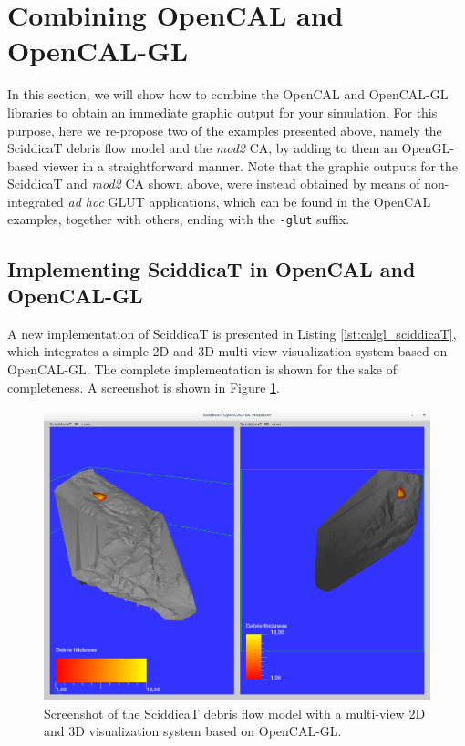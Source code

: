 \section{Combining OpenCAL and OpenCAL-GL}\label{sec:combining_gl}

In this section, we will show how to combine the OpenCAL and
OpenCAL-GL libraries to obtain an immediate graphic output for your
simulation. For this purpose, here we re-propose two of the examples
presented above, namely the SciddicaT debris flow model and the
\emph{mod2} CA, by adding to them an OpenGL-based viewer in a
straightforward manner. Note that the graphic outputs for the
SciddicaT and \emph{mod2} CA shown above, were instead obtained by
means of non-integrated \emph{ad hoc} GLUT applications, which can be
found in the OpenCAL examples, together with others, ending with the
\verb'-glut' suffix.

\subsection{Implementing SciddicaT in OpenCAL and OpenCAL-GL}\label{sec:calgl_sciddicaT}

A new implementation of SciddicaT is presented in Listing
\ref{lst:calgl_sciddicaT}, which integrates a simple 2D and 3D
multi-view visualization system based on OpenCAL-GL. The complete
implementation is shown for the sake of completeness. A screenshot is
shown in Figure \ref{fig:calgl_sciddicaT1}.

\begin{figure}
  \begin{center}
    \includegraphics[width=12cm]{./images/OpenCAL/calgl_sciddicaT1}
    \caption{Screenshot of the SciddicaT debris flow model with a
      multi-view 2D and 3D visualization system based on OpenCAL-GL.}
    \label{fig:calgl_sciddicaT1}
  \end{center}
\end{figure}

